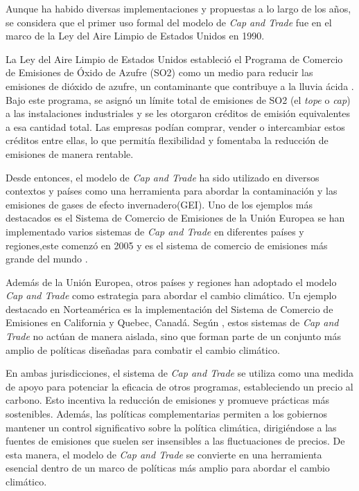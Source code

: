 Aunque ha habido diversas implementaciones y propuestas a lo largo de los años, se considera que el primer uso formal del modelo de \textit{Cap and Trade} fue en el marco de la Ley del Aire Limpio de Estados Unidos en 1990.
\vspace{2.5mm}

La Ley del Aire Limpio de Estados Unidos estableció el Programa de Comercio de Emisiones de Óxido de Azufre (SO2) como un medio para reducir las emisiones de dióxido de azufre, un contaminante que contribuye a la lluvia ácida . Bajo este programa, se asignó un límite total de emisiones de SO2 (el \textit{tope} o \textit{cap}) a las instalaciones industriales y se les otorgaron créditos de emisión equivalentes a esa cantidad total. Las empresas podían comprar, vender o intercambiar estos créditos entre ellas, lo que permitía flexibilidad y fomentaba la reducción de emisiones de manera rentable.
\vspace{2.5mm}


Desde entonces, el modelo de \textit{Cap and Trade} ha sido utilizado en diversos contextos y países como una herramienta para abordar la contaminación y las emisiones de gases de efecto invernadero(GEI). Uno de los ejemplos más destacados es el Sistema de Comercio de Emisiones de la Unión Europea se han implementado varios sistemas de \textit{Cap and Trade} en diferentes países y regiones,este comenzó en 2005 y es el sistema de comercio de emisiones más grande del mundo .
\vspace{2.5mm}


Además de la Unión Europea, otros países y regiones han adoptado el modelo \textit{Cap and Trade} como estrategia para abordar el cambio climático. Un ejemplo destacado en Norteamérica es la implementación del Sistema de Comercio de Emisiones en California y Quebec, Canadá. Según , estos sistemas de \textit{Cap and Trade} no actúan de manera aislada, sino que forman parte de un conjunto más amplio de políticas diseñadas para combatir el cambio climático.
\vspace{2.5mm}

En ambas jurisdicciones, el sistema de \textit{Cap and Trade} se utiliza como una medida de apoyo para potenciar la eficacia de otros programas, estableciendo un precio al carbono. Esto incentiva la reducción de emisiones y promueve prácticas más sostenibles. Además, las políticas complementarias permiten a los gobiernos mantener un control significativo sobre la política climática, dirigiéndose a las fuentes de emisiones que suelen ser insensibles a las fluctuaciones de precios. De esta manera, el modelo de \textit{Cap and Trade} se convierte en una herramienta esencial dentro de un marco de políticas más amplio para abordar el cambio climático.
\vspace{2.5mm}

